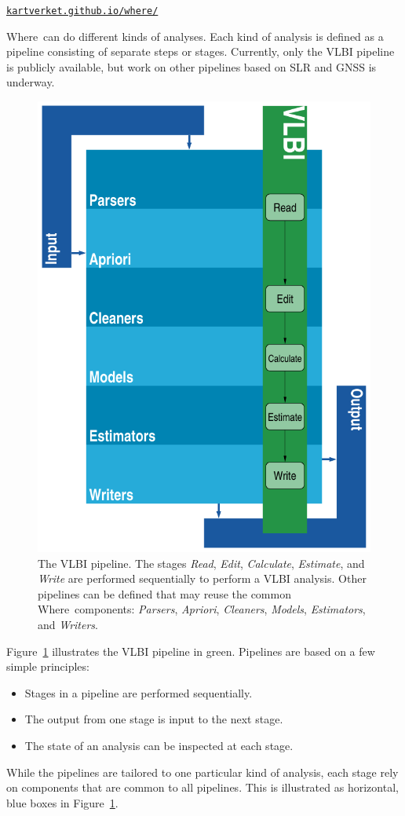 \documentclass[twocolumn,twoside]{svmultivs_gm} %
\newcommand{\where}{\textsf{Where}}
\begin{document}
\begin{center}
\footnotesize\texttt{\url{kartverket.github.io/where/}} 
\end{center}

\where\ can do different kinds of analyses. Each kind of analysis is defined as a pipeline consisting of separate steps or stages. Currently, only the VLBI pipeline is publicly available, but work on other pipelines based on SLR and GNSS is underway.

\begin{figure}[htb!]
  \includegraphics[width=.5\textwidth]{hjelle01.pdf}
  \caption{The VLBI pipeline. The stages \emph{Read}, \emph{Edit}, \emph{Calculate}, \emph{Estimate}, and \emph{Write} are performed sequentially to perform a VLBI analysis. Other pipelines can be defined that may reuse the common \where\ components: \emph{Parsers}, \emph{Apriori}, \emph{Cleaners}, \emph{Models}, \emph{Estimators}, and \emph{Writers}.}
  \label{fig:pipeline}
\end{figure}

Figure~\ref{fig:pipeline} illustrates the VLBI pipeline in green. Pipelines are based on a few simple principles:
\begin{itemize}
\item Stages in a pipeline are performed sequentially.
\item The output from one stage is input to the next stage.
\item The state of an analysis can be inspected at each stage.
\end{itemize}

While the pipelines are tailored to one particular kind of analysis, each stage rely on components that are common to all pipelines. This is illustrated as horizontal, blue boxes in Figure~\ref{fig:pipeline}.
\end{document}
